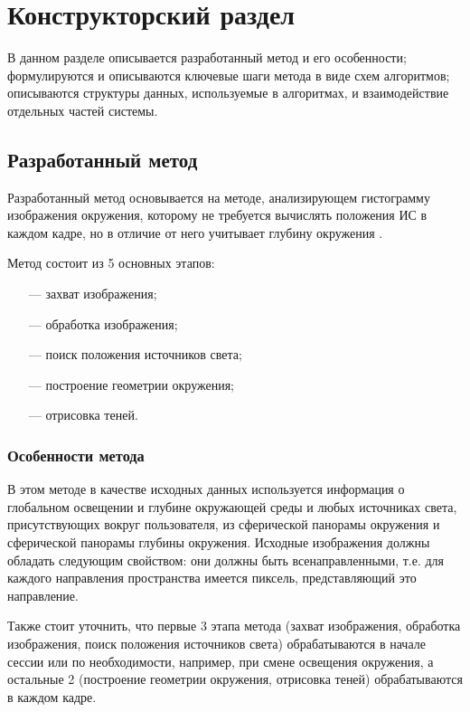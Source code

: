 \chapter{Конструкторский раздел}

В данном разделе описывается разработанный метод и его особенности; формулируются и описываются ключевые шаги метода в виде схем алгоритмов; описываются структуры данных, используемые в алгоритмах, и взаимодействие отдельных частей системы.

\section{Разработанный метод}

Разработанный метод основывается на методе, анализирующем гистограмму изображения окружения, которому не требуется вычислять положения ИС в каждом кадре, но в отличие от него учитывает глубину окружения \cite{osti2019real}.

Метод состоит из 5 основных этапов:

\begin{enumerate}
	\item[---] захват изображения;
	\item[---] обработка изображения;
	\item[---] поиск положения источников света;
	\item[---] построение геометрии окружения;
	\item[---] отрисовка теней.
\end{enumerate}

\subsection{Особенности метода}

В этом методе в качестве исходных данных используется информация о глобальном освещении и глубине окружающей среды и любых источниках света, присутствующих вокруг пользователя, из сферической панорамы окружения и сферической панорамы глубины окружения. Исходные изображения должны обладать следующим свойством: они должны быть всенаправленными, т.е. для каждого направления пространства имеется пиксель, представляющий это направление.

Также стоит уточнить, что первые 3 этапа метода (захват изображения, обработка изображения, поиск положения источников света) обрабатываются в начале сессии или по необходимости, например, при смене освещения окружения, а остальные 2 (построение геометрии окружения, отрисовка теней) обрабатываются в каждом кадре.

